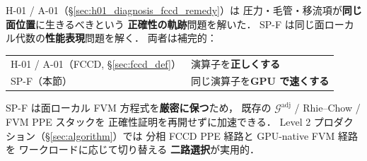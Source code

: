 H-01 / A-01（\S\ref{sec:h01_diagnosis_fccd_remedy}）は
圧力・毛管・移流項が\textbf{同じ面位置}に生きるべきという
\textbf{正確性の軌跡}問題を解いた．
SP-F は同じ面ローカル代数の\textbf{性能表現}問題を解く．
両者は補完的：
\begin{center}
\begin{tabular}{@{}ll@{}}
\hline
H-01 / A-01（FCCD, \S\ref{sec:fccd_def}）& 演算子を\textbf{正しくする} \\
SP-F（本節）& 同じ演算子を\textbf{GPU で速くする} \\
\hline
\end{tabular}
\end{center}
SP-F は面ローカル FVM 方程式を\textbf{厳密に保つ}ため，
既存の $\mathcal{G}^\text{adj}$ / Rhie--Chow / FVM PPE スタックを
正確性証明を再開せずに加速できる．
Level 2 プロダクション（\S\ref{sec:algorithm}）では
分相 FCCD PPE 経路と GPU-native FVM 経路を
ワークロードに応じて切り替える
\textbf{二路選択}が実用的．

